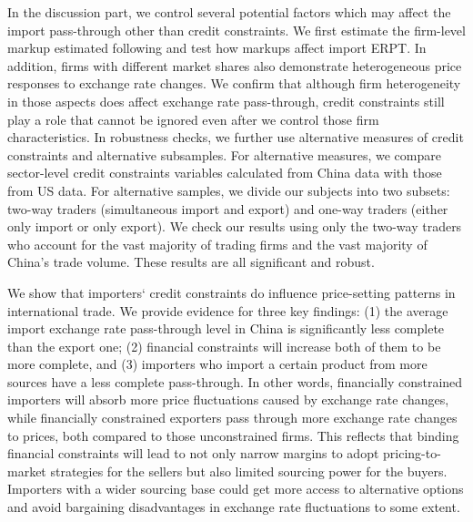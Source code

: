 \documentclass[12pt]{article}
\begin{document}
In the discussion part, we control several potential factors which may affect the import pass-through other than credit constraints. We first estimate the firm-level markup estimated following \cite{dlw2012} and test how markups affect import ERPT. In addition, firms with different market shares also demonstrate heterogeneous price responses to exchange rate changes. We confirm that although firm heterogeneity in those aspects does affect exchange rate pass-through, credit constraints still play a role that cannot be ignored even after we control those firm characteristics. In robustness checks, we further use alternative measures of credit constraints and alternative subsamples. For alternative measures, we compare sector-level credit constraints variables calculated from China data with those from US data. For alternative samples, we divide our subjects into two subsets: two-way traders (simultaneous import and export) and one-way traders (either only import or only export). We check our results using only the two-way traders who account for the vast majority of trading firms and the vast majority of China's trade volume. These results are all significant and robust.

We show that importers‘ credit constraints do influence price-setting patterns in international trade. We provide evidence for three key findings: (1) the average import exchange rate pass-through level in China is significantly less complete than the export one; (2) financial constraints will increase both of them to be more complete, and (3) importers who import a certain product from more sources have a less complete pass-through. In other words, financially constrained importers will absorb more price fluctuations caused by exchange rate changes, while financially constrained exporters pass through more exchange rate changes to prices, both compared to those unconstrained firms. This reflects that binding financial constraints will lead to not only narrow margins to adopt pricing-to-market strategies for the sellers but also limited sourcing power for the buyers. Importers with a wider sourcing base could get more access to alternative options and avoid bargaining disadvantages in exchange rate fluctuations to some extent.
\end{document}
